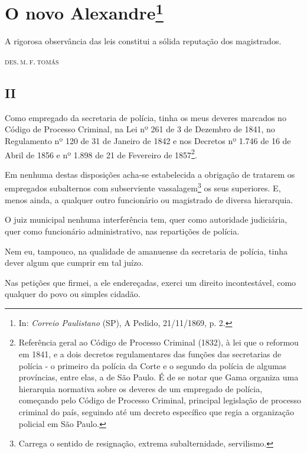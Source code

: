 \chapter{O novo Alexandre\footnote[*]{In: \emph{Correio Paulistano}
  (SP), A Pedido, 21/11/1869, p. 2.}}

\epigraph{A rigorosa observância das leis constitui a sólida reputação dos
magistrados.}{\textsc{des.\,m.\,f.\,tomás}\footnotemark}

\section*{II}

Como empregado da secretaria de polícia, tinha os meus deveres marcados
no Código de Processo Criminal, na Lei nº 261 de 3 de Dezembro de 1841,
no Regulamento nº 120 de 31 de Janeiro de 1842 e nos Decretos nº 1.746
de 16 de Abril de 1856 e nº 1.898 de 21 de Fevereiro de 1857\footnote{
  Referência geral ao Código de Processo Criminal (1832), à lei que o
  reformou em 1841, e a dois decretos regulamentares das funções das
  secretarias de polícia - o primeiro da polícia da Corte e o segundo da
  polícia de algumas províncias, entre elas, a de São Paulo. É de se
  notar que Gama organiza uma hierarquia normativa sobre os deveres de
  um empregado de polícia, começando pelo Código de Processo Criminal,
  principal legislação de processo criminal do país, seguindo até um
  decreto específico que regia a organização policial em São Paulo.}.

Em nenhuma destas disposições acha-se estabelecida a obrigação de
tratarem os empregados subalternos com subserviente vassalagem\footnote{
  Carrega o sentido de resignação, extrema subalternidade, servilismo.}
os seus superiores. E, menos ainda, a qualquer outro funcionário ou
magistrado de diversa hierarquia.

O juiz municipal nenhuma interferência tem, quer como autoridade
judiciária, quer como funcionário administrativo, nas repartições de
polícia.

Nem eu, tampouco, na qualidade de amanuense da secretaria de polícia,
tinha dever algum que cumprir em tal juízo.

Nas petições que firmei, a ele endereçadas, exerci um direito
incontestável, como qualquer do povo ou simples cidadão.

